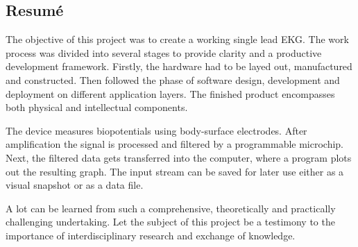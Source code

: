 \documentclass[titlepage,12pt]{article}
\begin{document}
\subsection*{Resumé}
The objective of this project was to create a working single lead EKG. The work process was divided into several stages to provide clarity and a productive development framework. Firstly, the hardware had to be layed out, manufactured and constructed. Then followed the phase of software design, development and deployment on different application layers. The finished product encompasses both physical and intellectual components.

The device measures biopotentials using body-surface electrodes. After amplification the signal is processed and filtered by a programmable microchip. Next, the filtered data gets transferred into the computer, where a program plots out the resulting graph. The input stream can be saved for later use either as a visual snapshot or as a data file.

A lot can be learned from such a comprehensive, theoretically and practically challenging undertaking. Let the subject of this project be a testimony to the importance of interdisciplinary research and exchange of knowledge.





\newpage
\end{document}
